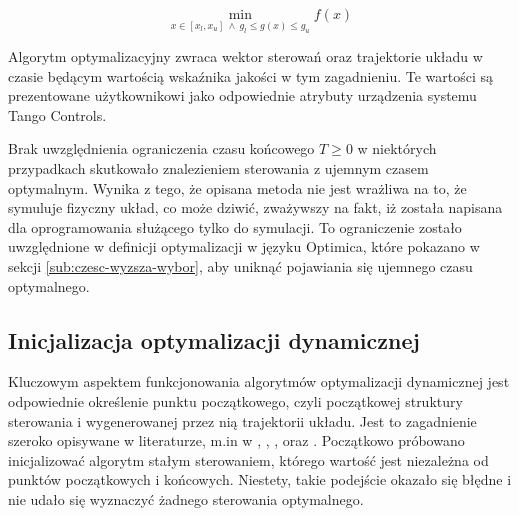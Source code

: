 \begin{equation}\label{eq:opt-stat}
    \min\limits_{x \in [x_{l}, x_{u}]~ \land~ g_{l} \leq g(x) \leq g_{u}} f(x)
\end{equation}

Algorytm optymalizacyjny zwraca wektor sterowań oraz trajektorie układu w czasie będącym wartością wskaźnika jakości w tym zagadnieniu. Te wartości są prezentowane użytkownikowi jako odpowiednie atrybuty urządzenia systemu Tango Controls.

Brak uwzględnienia ograniczenia czasu końcowego $T \geq 0$ w niektórych przypadkach skutkowało znalezieniem sterowania z ujemnym czasem optymalnym. Wynika z tego, że opisana metoda nie jest wrażliwa na to, że symuluje fizyczny układ, co może dziwić, zważywszy na fakt, iż została napisana dla oprogramowania służącego tylko do symulacji.
To ograniczenie zostało uwzględnione w definicji optymalizacji w języku Optimica, które pokazano w sekcji \ref{sub:czesc-wyzsza-wybor}, aby uniknąć pojawiania się ujemnego czasu optymalnego.

\subsection{Inicjalizacja optymalizacji dynamicznej}
\label{sub:opt-init}

Kluczowym aspektem funkcjonowania algorytmów optymalizacji dynamicznej jest odpowiednie określenie punktu początkowego, czyli początkowej struktury sterowania i wygenerowanej przez nią trajektorii układu. Jest to zagadnienie szeroko opisywane w literaturze, m.in w \cite{Betts98}, \cite{Rao2010}, \cite{Korytowski2015}, \cite{cas+11ifac} oraz \cite{JModelicaUserGuide}.
Początkowo próbowano inicjalizować algorytm stałym sterowaniem, którego wartość jest niezależna od punktów początkowych i końcowych. Niestety, takie podejście okazało się błędne i nie udało się wyznaczyć żadnego sterowania optymalnego.

